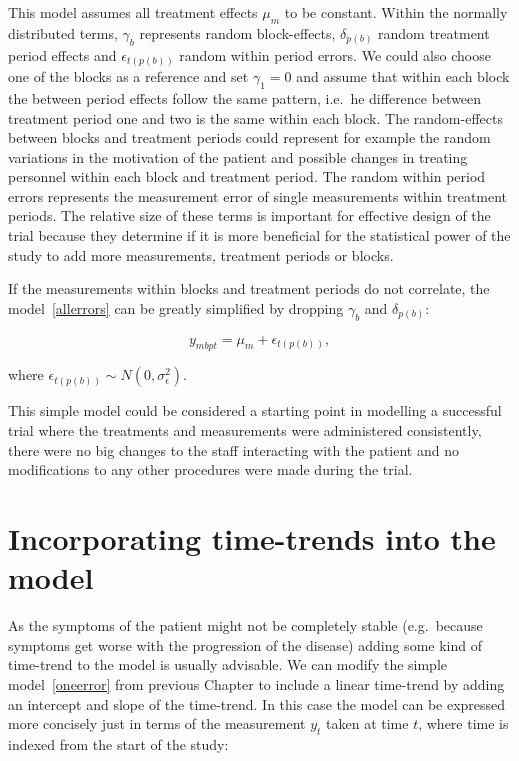 \documentclass[12pt,a4paper,leqno]{report}
\theoremstyle{plain}
\theoremstyle{definition}
\theoremstyle{remark}
\begin{document}
This model assumes all treatment effects \(\mu_m\) to be constant. Within the
normally distributed terms, \(\gamma_b\) represents random block-effects,
\(\delta_{p(b)}\) random treatment period effects and \(\epsilon_{t(p(b))}\) random within
period errors. We could also choose one of the blocks as a reference and set
\(\gamma_1 = 0\) and assume that within each block the between period effects
follow the same pattern, i.e.\ he difference between treatment period one and
two is the same within each block. The random-effects between blocks and treatment
periods could represent for example the random variations in the motivation of the patient and possible
changes in treating personnel within each block and treatment period. The random
within period errors represents the measurement error of single measurements
within treatment periods. The relative size of these terms is important
for effective design of the trial because they determine if it is more
beneficial for the statistical power of the study to add more measurements,
treatment periods or blocks.

If the measurements within blocks and treatment periods do not correlate, the
model\ \ref{allerrors} can be greatly simplified by dropping \(\gamma_b\) and
\(\delta_{p(b)}\):

\begin{def}\label{}
    \begin{equation}\label{oneerror}
        y_{mbpt} = \mu_m + \epsilon_{t(p(b))},
    \end{equation}
\end{def}where \(\epsilon_{t(p(b))} \sim N(0,\sigma^2_{\epsilon})\).

This simple model could be considered a starting point in modelling a successful trial where
the treatments and measurements were administered consistently, there were no big changes to the staff interacting
with the patient and no modifications to any other procedures were made during
the trial.

\section{Incorporating time-trends into the model}\label{timetrends}

As the symptoms of the patient might not be completely stable (e.g.\ because
symptoms get worse with the progression of the disease) adding some kind of
time-trend to the model is usually advisable. We can modify the simple model\ \ref{oneerror} from previous Chapter to include a linear time-trend by adding an
intercept and slope of the time-trend. In this case the model can be expressed more
concisely just in terms of the measurement \(y_t\) taken at time \(t\), where
time is indexed from the start of the study:
\end{document}
